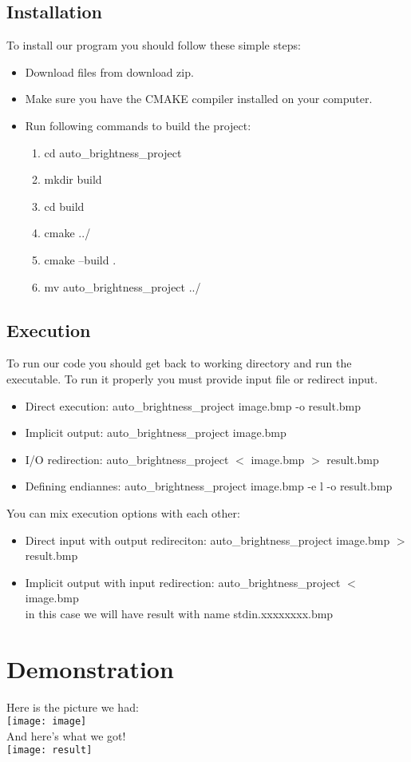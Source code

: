 \documentclass{article}
\begin{document}
\subsection{Installation}
To install our program you should follow these simple steps:
\begin{itemize}
\item Download files from download zip.
\item Make sure you have the CMAKE compiler installed on your computer.
\item Run following  commands to build the project:
\begin{enumerate}
\item \colorbox{gray!15}{cd auto\_brightness\_project}
\item \colorbox{gray!15}{mkdir build}
\item \colorbox{gray!15}{cd build}
\item \colorbox{gray!15}{cmake ../}
\item \colorbox{gray!15}{cmake --build .}
\item\colorbox{gray!15}{ mv auto\_brightness\_project ../}
\end{enumerate}
\end{itemize}
\subsection{Execution}
To run our code you should get back to working directory and run the executable. To run it properly you must provide input file or redirect input.
\begin{itemize}
\item Direct execution: \colorbox{gray!15}{auto\_brightness\_project image.bmp -o result.bmp}
\item Implicit output: \colorbox{gray!15}{auto\_brightness\_project image.bmp}
\item I/O redirection: \colorbox{gray!15}{auto\_brightness\_project $<$ image.bmp $>$ result.bmp}
\item Defining endiannes: \colorbox{gray!15}{auto\_brightness\_project image.bmp -e l -o result.bmp}
\end{itemize}
You can mix execution options with each other:
\begin{itemize}
\item Direct input with output redireciton: \colorbox{gray!15}{auto\_brightness\_project image.bmp $>$ result.bmp}
\item Implicit output with input redirection: \colorbox{gray!15}{auto\_brightness\_project $<$ image.bmp}
\\ in this case we will have result with name \colorbox{gray!15}{stdin.xxxxxxxx.bmp}

\end{itemize}
\section{Demonstration}
Here is the picture we had:
\\[1\baselineskip]
\texttt{[image: image]}
\\[1\baselineskip]
And here's what we got!
\\[1\baselineskip]
\texttt{[image: result]}
\end{document}
